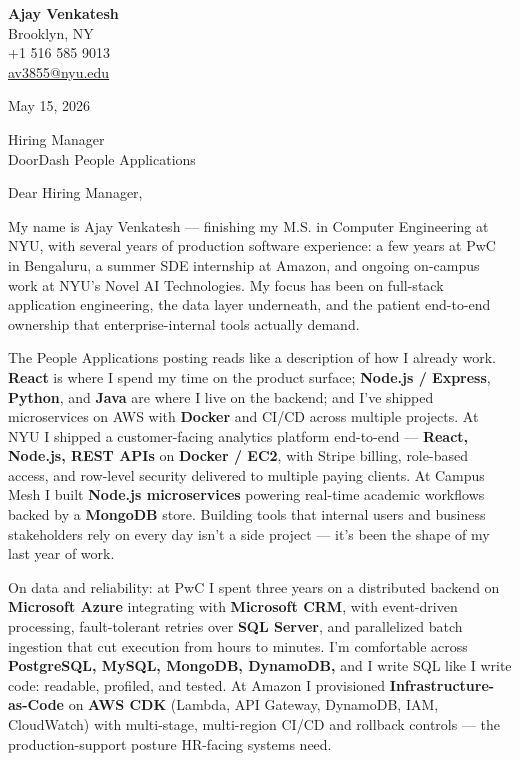 \documentclass[letterpaper,11pt]{article}
\begin{document}
\begin{flushleft}
\textbf{\large Ajay Venkatesh} \\
Brooklyn, NY \\
+1 516 585 9013 \\
\href{mailto:av3855@nyu.edu}{av3855@nyu.edu}
\end{flushleft}

\vspace{10pt}

May 15, 2026

\vspace{6pt}

Hiring Manager \\
DoorDash People Applications

\vspace{10pt}

Dear Hiring Manager,

My name is Ajay Venkatesh --- finishing my M.S. in Computer Engineering at NYU, with several years of production software experience: a few years at PwC in Bengaluru, a summer SDE internship at Amazon, and ongoing on-campus work at NYU's Novel AI Technologies. My focus has been on full-stack application engineering, the data layer underneath, and the patient end-to-end ownership that enterprise-internal tools actually demand.

The People Applications posting reads like a description of how I already work. \textbf{React} is where I spend my time on the product surface; \textbf{Node.js / Express}, \textbf{Python}, and \textbf{Java} are where I live on the backend; and I've shipped microservices on AWS with \textbf{Docker} and CI/CD across multiple projects. At NYU I shipped a customer-facing analytics platform end-to-end --- \textbf{React, Node.js, REST APIs} on \textbf{Docker / EC2}, with Stripe billing, role-based access, and row-level security delivered to multiple paying clients. At Campus Mesh I built \textbf{Node.js microservices} powering real-time academic workflows backed by a \textbf{MongoDB} store. Building tools that internal users and business stakeholders rely on every day isn't a side project --- it's been the shape of my last year of work.

On data and reliability: at PwC I spent three years on a distributed backend on \textbf{Microsoft Azure} integrating with \textbf{Microsoft CRM}, with event-driven processing, fault-tolerant retries over \textbf{SQL Server}, and parallelized batch ingestion that cut execution from hours to minutes. I'm comfortable across \textbf{PostgreSQL, MySQL, MongoDB, DynamoDB,} and I write SQL like I write code: readable, profiled, and tested. At Amazon I provisioned \textbf{Infrastructure-as-Code} on \textbf{AWS CDK} (Lambda, API Gateway, DynamoDB, IAM, CloudWatch) with multi-stage, multi-region CI/CD and rollback controls --- the production-support posture HR-facing systems need.
\end{document}
